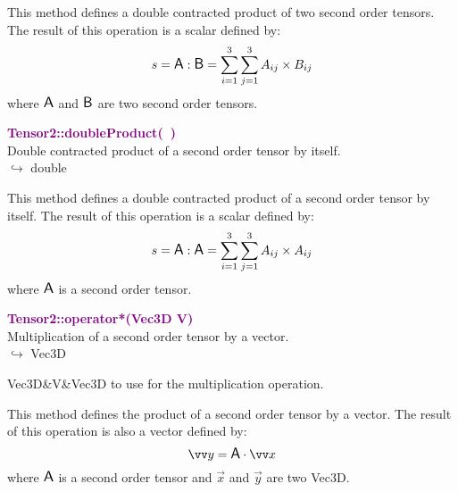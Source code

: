 This method defines a double contracted product of two second order tensors.
The result of this operation is a scalar defined by:
\begin{equation*}
s = \mbox{\large\ensuremath{\mathsf{A}}} : \mbox{\large\ensuremath{\mathsf{B}}} = \sum_{i=1}^{3} \sum_{j=1}^{3} A_{ij}\times B_{ij}
\end{equation*}
where $\mbox{\large\ensuremath{\mathsf{A}}}$ and $\mbox{\large\ensuremath{\mathsf{B}}}$ are two second order tensors.

\textcolor{purple}{\textbf{Tensor2::doubleProduct(~)}}\label{Tensor2::doubleProduct()}\\
Double contracted product of a second order tensor by itself.\\ \hspace*{10mm}$\hookrightarrow$ double

This method defines a double contracted product of a second order tensor by itself.
The result of this operation is a scalar defined by:
\begin{equation*}
s = \mbox{\large\ensuremath{\mathsf{A}}} : \mbox{\large\ensuremath{\mathsf{A}}} = \sum_{i=1}^{3} \sum_{j=1}^{3} A_{ij}\times A_{ij}
\end{equation*}
where $\mbox{\large\ensuremath{\mathsf{A}}}$ is a second order tensor.

\textcolor{purple}{\textbf{Tensor2::operator*(Vec3D V)}}\label{Tensor2::operator*(Vec3D V)}\\
Multiplication of a second order tensor by a vector.\\ \hspace*{10mm}$\hookrightarrow$ Vec3D

\begin{tcolorbox}[width=\textwidth,myArgs,tabularx={ll|R},title=Arguments of Tensor2::operator*]
Vec3D&V&Vec3D to use for the multiplication operation.
\end{tcolorbox}

This method defines the product of a second order tensor by a vector.
The result of this operation is also a vector defined by:
\begin{equation*}
\overrightarrow{y} = \A \cdot \overrightarrow{x}
\end{equation*}
where $\mbox{\large\ensuremath{\mathsf{A}}}$ is a second order tensor and $\overrightarrow{x}$ and $\overrightarrow{y}$ are two Vec3D.

